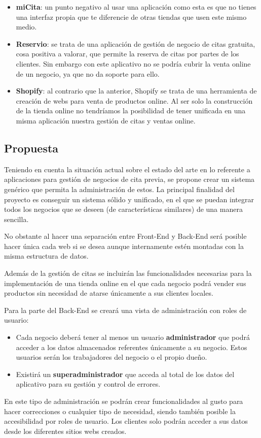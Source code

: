 \begin{itemize}
    \item \textbf{miCita}: un punto negativo al usar una aplicación como esta es que no tienes una interfaz propia
    que te diferencie de otras tiendas que usen este mismo medio.

    \item \textbf{Reservio}: se trata de una aplicación de gestión de negocio de citas gratuita, cosa positiva a
    valorar, que permite la reserva de citas por partes de los clientes. Sin embargo con este aplicativo no se
    podría cubrir la venta online de un negocio, ya que no da soporte para ello.

    \item \textbf{Shopify}: al contrario que la anterior, Shopify se trata de una herramienta de creación de webs
    para venta de productos online. Al ser solo la construcción de la tienda online no tendríamos la posibilidad de
    tener unificada en una misma aplicación nuestra gestión de citas y ventas online.
\end{itemize}

\subsection{Propuesta}
Teniendo en cuenta la situación actual sobre el estado del arte en lo referente a aplicaciones para
gestión de negocios de cita previa, se propone crear un sistema genérico que permita la administración
de estos. La principal finalidad del proyecto es conseguir un sistema sólido y unificado, en el que se
puedan integrar todos los negocios que se deseen (de características similares) de una manera sencilla.

No obstante al hacer una separación entre Front-End y Back-End será posible hacer única cada web si se
desea aunque internamente estén montadas con la misma estructura de datos.

Además de la gestión de citas se incluirán las funcionalidades necesarias para la implementación de una
tienda online en el que cada negocio podrá vender sus productos sin necesidad de atarse únicamente
a sus clientes locales.

Para la parte del Back-End se creará una vista de administración con roles de usuario:

\vspace{-0.5em}
\begin{itemize}
    \item Cada negocio deberá tener al menos un usuario \textbf{administrador} que podrá acceder a los datos
    almacenados referentes únicamente a su negocio. Estos usuarios serán los trabajadores del negocio o el propio
    dueño.

    \item Existirá un \textbf{superadministrador} que acceda al total de los datos del aplicativo
    para su gestión y control de errores.
\end{itemize}

En este tipo de administración se podrán crear funcionalidades al gusto para hacer correcciones o
cualquier tipo de necesidad, siendo también posible la accesibilidad por roles de usuario.
Los clientes solo podrán acceder a sus datos desde los diferentes sitios webs creados.